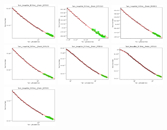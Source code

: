 \documentclass{article} %
\begin{document}
\begin{figure}[]
\includegraphics[width=0.245\textwidth]{figures/scaling_laws_benchmark_dataset_plots/few_shot_10___BiT_50_1.png}
\includegraphics[width=0.245\textwidth]{figures/scaling_laws_benchmark_dataset_plots/few_shot_10___BiT_101_3.png}
\includegraphics[width=0.245\textwidth]{figures/scaling_laws_benchmark_dataset_plots/few_shot_10___MiX_B_16.png}
\includegraphics[width=0.245\textwidth]{figures/scaling_laws_benchmark_dataset_plots/few_shot_10___MiX_L_16.png}
\includegraphics[width=0.245\textwidth]{figures/scaling_laws_benchmark_dataset_plots/few_shot_10___ViT_B_16.png}
\includegraphics[width=0.245\textwidth]{figures/scaling_laws_benchmark_dataset_plots/few_shot_10___ViT_S_16.png}
\includegraphics[width=0.245\textwidth]{figures/scaling_laws_benchmark_dataset_plots/few_shot_25___BiT_50_1.png}

\end{figure}
\end{document}
